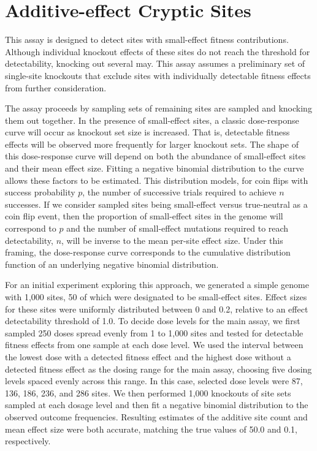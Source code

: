 \section{Additive-effect Cryptic Sites}

This assay is designed to detect sites with small-effect fitness contributions.
Although individual knockout effects of these sites do not reach the threshold for detectability, knocking out several may.
This assay assumes a preliminary set of single-site knockouts that exclude sites with individually detectable fitness effects from further consideration.

The assay proceeds by sampling sets of remaining sites are sampled and knocking them out together.
In the presence of small-effect sites, a classic dose-response curve will occur as knockout set size is increased.
That is, detectable fitness effects will be observed more frequently for larger knockout sets.
The shape of this dose-response curve will depend on both the abundance of small-effect sites and their mean effect size.
Fitting a negative binomial distribution to the curve allows these factors to be estimated.
This distribution models, for coin flips with success probability $p$, the number of successive trials required to achieve $n$ successes.
If we consider sampled sites being small-effect versus true-neutral as a coin flip event, then the proportion of small-effect sites in the genome will correspond to $p$ and the number of small-effect mutations required to reach detectability, $n$, will be inverse to the mean per-site effect size.
Under this framing, the dose-response curve corresponds to the cumulative distribution function of an underlying negative binomial distribution.

For an initial experiment exploring this approach, we generated a simple genome with 1,000 sites, 50 of which were designated to be small-effect sites.
Effect sizes for these sites were uniformly distributed between 0 and 0.2, relative to an effect detectability threshold of 1.0.
To decide dose levels for the main assay, we first sampled 250 doses spread evenly from 1 to 1,000 sites and tested for detectable fitness effects from one sample at each dose level.
We used the interval between the lowest dose with a detected fitness effect and the highest dose without a detected fitness effect as the dosing range for the main assay, choosing five dosing levels spaced evenly across this range.
In this case, selected dose levels were 87, 136, 186, 236, and 286 sites.
We then performed 1,000 knockouts of site sets sampled at each dosage level and then fit a negative binomial distribution to the observed outcome frequencies.
Resulting estimates of the additive site count and mean effect size were both accurate, matching the true values of 50.0 and 0.1, respectively.

